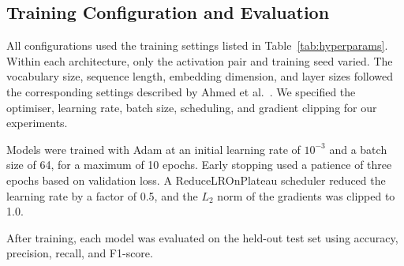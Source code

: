 \documentclass[conference,a4paper]{IEEEtran}
\begin{document}
\subsection{Training Configuration and Evaluation}

All configurations used the training settings listed in
Table~\ref{tab:hyperparams}. Within each architecture,
only the activation pair and training seed varied.
The vocabulary size, sequence length, embedding dimension,
and layer sizes followed the corresponding settings
described by Ahmed et al.~\cite{ahmed2025}. We specified
the optimiser, learning rate, batch size, scheduling,
and gradient clipping for our experiments.

Models were trained with Adam at an initial learning rate
of $10^{-3}$ and a batch size of 64, for a maximum of
10 epochs. Early stopping used a patience of three epochs
based on validation loss. A ReduceLROnPlateau scheduler
reduced the learning rate by a factor of 0.5, and the
$L_2$ norm of the gradients was clipped to 1.0.

After training, each model was evaluated on the held-out
test set using accuracy, precision, recall, and F1-score.

\begin{table}[htbp]
  \caption{Shared Hyperparameter Configuration}
  \label{tab:hyperparams}
  \centering
  \footnotesize
  \setlength{\tabcolsep}{3pt}
  \renewcommand{\arraystretch}{1.05}
\end{table}
\end{document}
